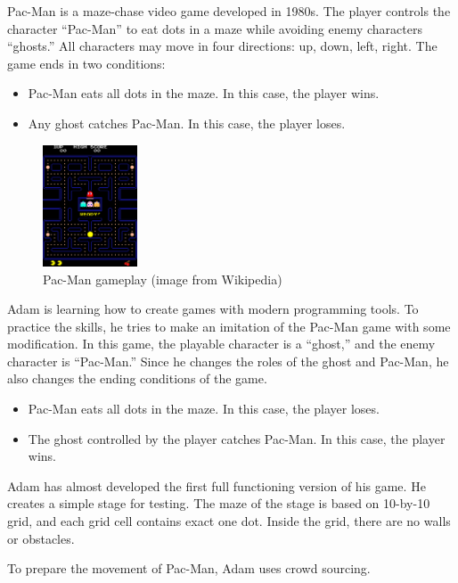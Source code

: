 Pac-Man is a maze-chase video game developed in 1980s. 
The player controls the character ``Pac-Man'' to eat dots in a maze while
avoiding enemy characters ``ghosts.'' 
All characters may move in four directions: up, down, left, right.
The game ends in two conditions:
\begin{itemize}
\item Pac-Man eats all dots in the maze. In this case, the player wins.
\item Any ghost catches Pac-Man. In this case, the player loses.
\end{itemize}

\begin{figure}[h]
\center
\includegraphics[width=0.25\textwidth]{image/pacman.png}
\caption{Pac-Man gameplay (image from Wikipedia)}
\end{figure}

Adam is learning how to create games with modern programming tools.
To practice the skills, he tries to make an imitation of the Pac-Man 
game with some modification.
In this game, the playable character is a ``ghost,'' 
and the enemy character is ``Pac-Man.'' 
Since he changes the roles of the ghost and Pac-Man, 
he also changes the ending conditions of the game.
\begin{itemize}
\item Pac-Man eats all dots in the maze. In this case, the player loses.
\item The ghost controlled by the player catches Pac-Man. In this case, the player wins.
\end{itemize}

Adam has almost developed the first full functioning version of his game.
He creates a simple stage for testing.
The maze of the stage is based on 10-by-10 grid, and each grid cell contains 
exact one dot.
Inside the grid, there are no walls or obstacles.
 

To prepare the movement of Pac-Man, Adam uses crowd sourcing.


